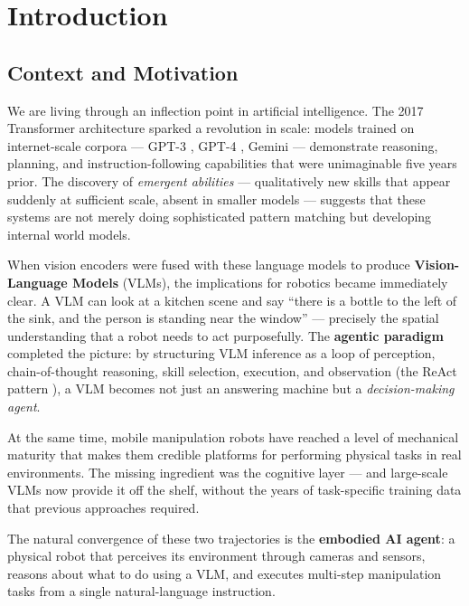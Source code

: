 \chapter{Introduction}
\label{ch:introduction}

\section{Context and Motivation}

We are living through an inflection point in artificial intelligence.
The 2017 Transformer architecture \cite{vaswani2017attention} sparked a revolution in
scale: models trained on internet-scale corpora --- GPT-3 \cite{brown2020gpt3},
GPT-4 \cite{achiam2023gpt4}, Gemini \cite{team2023gemini} --- demonstrate reasoning,
planning, and instruction-following capabilities that were unimaginable five years prior.
The discovery of \emph{emergent abilities} --- qualitatively new skills that appear
suddenly at sufficient scale, absent in smaller models --- suggests that these systems
are not merely doing sophisticated pattern matching but developing internal world models.

When vision encoders were fused with these language models to produce
\textbf{Vision-Language Models} (VLMs), the implications for robotics became
immediately clear.
A VLM can look at a kitchen scene and say ``there is a bottle to the left of the sink,
and the person is standing near the window'' --- precisely the spatial understanding
that a robot needs to act purposefully.
The \textbf{agentic paradigm} completed the picture: by structuring VLM inference as a
loop of perception, chain-of-thought reasoning, skill selection, execution, and
observation (the ReAct pattern \cite{yao2022react}), a VLM becomes not just an
answering machine but a \emph{decision-making agent}.

At the same time, mobile manipulation robots have reached a level of mechanical
maturity that makes them credible platforms for performing physical tasks in real
environments.
The missing ingredient was the cognitive layer --- and large-scale VLMs now provide it
off the shelf, without the years of task-specific training data that previous approaches
required.

The natural convergence of these two trajectories is the \textbf{embodied AI agent}:
a physical robot that perceives its environment through cameras and sensors, reasons
about what to do using a VLM, and executes multi-step manipulation tasks from a single
natural-language instruction.


